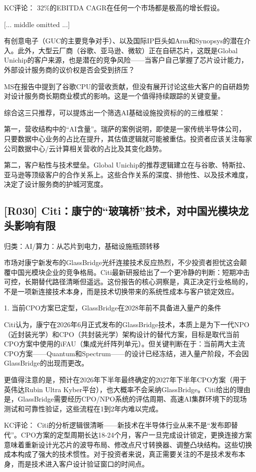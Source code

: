 \documentclass[11pt]{ctexart}
\begin{document}
KC评论： 32\%的EBITDA CAGR在任何一个市场都是极高的增长假设。

[... middle omitted ...]

有创意电子（GUC的主要竞争对手）、以及国际IP巨头如Arm和Synopsys的潜在介入。此外，大型云厂商（谷歌、亚马逊、微软）正在自研芯片，这既是Global Unichip的客户来源，也是潜在的竞争风险——当客户自己掌握了芯片设计能力，外部设计服务商的议价权是否会受到挤压？

MS在报告中提到了谷歌CPU的营收贡献，但没有展开讨论这些大客户的自研趋势对设计服务商长期商业模式的影响。这是一个值得持续跟踪的关键变量。

综合这三只推荐，可以提炼出一个筛选AI基础设施投资标的的三维框架：

第一，营收结构中的“AI含量”。瑞萨的案例说明，即使是一家传统半导体公司，只要数据中心业务的占比在提升，其估值逻辑就可能被重估。投资者应该关注每家公司数据中心/云计算相关营收的占比及其变化趋势。

第二，客户粘性与技术壁垒。Global Unichip的推荐逻辑建立在与谷歌、特斯拉、亚马逊等顶级客户的合作关系上。这些合作关系的深度、排他性、以及技术难度，决定了设计服务商的护城河宽度。

\subsection{[R030] Citi：康宁的“玻璃桥”技术，对中国光模块龙头影响有限}
{\small\color{refgray}归类：AI/算力：从芯片到电力，基础设施瓶颈转移}

市场对康宁新发布的GlassBridge光纤连接技术反应热烈，不少投资者担忧这会颠覆中国光模块企业的竞争格局。Citi最新研报给出了一个更冷静的判断：短期冲击可控，长期替代路径清晰但遥远。这份报告的核心洞察是，真正决定行业格局的，不是一项新连接技术本身，而是技术切换带来的系统性成本与客户锁定效应。

1. 当前CPO方案已定型，GlassBridge在2028年前不具备进入量产的条件

Citi认为，康宁在2026年6月正式发布的GlassBridge技术，本质上是为下一代NPO（近封装光学）和CPO（共封装光学）架构设计的替代方案，目标是取代当前CPO方案中使用的iFAU（集成光纤阵列单元）。但关键判断在于：当前两大主流CPO方案——Quantum和Spectrum——的设计已经冻结，进入量产阶段，不会因GlassBridge的出现而更改。

更值得注意的是，预计在2026年下半年最终确定的2027年下半年CPO方案（用于英伟达Rubin Ultra Kyber平台），也大概率不会采纳GlassBridge。Citi给出的理由是，GlassBridge需要经历CPO/NPO系统的评估周期、高速AI集群环境下的现场测试和可靠性验证，这些流程在1到2年内难以完成。

KC评论： Citi的分析逻辑很清晰——新技术在半导体行业从来不是“发布即替代”。CPO方案的定型周期长达18-24个月，客户一旦完成设计锁定，更换连接方案意味着重新设计光芯片的波导布局、修改点尺寸转换器、调整凸块结构。这些切换成本构成了强大的技术惯性。对于投资者来说，真正需要关注的不是技术发布本身，而是技术进入客户设计验证窗口的时间点。
\end{document}
